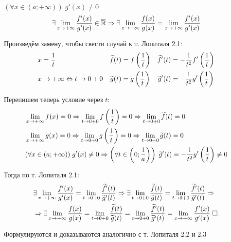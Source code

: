 \documentclass{article}
\begin{document}
$(\forall x\in(a;+\infty))\;g'(x)\neq 0$
\begin{align*}
	\exists \lim\limits_{x\to +\infty}\frac{f'(x)}{g'(x)}\in\overline{\mathbb{R}}\Rightarrow\exists\lim\limits_{x\to +\infty}\frac{f(x)}{g(x)}=\lim\limits_{x\to +\infty}\frac{f'(x)}{g'(x)}
\end{align*}

\proof

Произведём замену, чтобы свести случай к т. Лопиталя 2.1:
\begin{align*}
	 & x=\frac{1}{t}               & \widetilde{f}(t) & =f\left(\frac{1}{t}\right) & \widetilde{f}'(t) & =-\frac{1}{t^{2}}f'\left(\frac{1}{t}\right) \\
	 & x\to +\infty\Leftrightarrow t\to 0+0 & \widetilde{g}(t) & =g\left(\frac{1}{t}\right) & \widetilde{g}'(t) & =-\frac{1}{t^{2}}g'\left(\frac{1}{t}\right)
\end{align*}

Перепишем теперь условие через $t$:
\begin{align*}
	 & \lim\limits_{x\to +\infty}f(x)=0\Rightarrow\lim\limits_{t\to 0+0}f\left(\frac{1}{t}\right)=0\Rightarrow\lim\limits_{t\to 0+0}\widetilde{f}(t)=0 \\
	 & \lim\limits_{x\to +\infty}g(x)=0\Rightarrow\lim\limits_{t\to 0+0}g\left(\frac{1}{t}\right)=0\Rightarrow\lim\limits_{t\to 0+0}\widetilde{g}(t)=0 \\
	 & (\forall x\in(a;+\infty))\;g'(x)\neq 0\Rightarrow
	\left(\forall t\in\left(0;\frac{1}{a}\right)\right)\;\widetilde{g}'(t)=-\frac{1}{t^{2}}g'\left(\frac{1}{t}\right)\neq 0
\end{align*}

Тогда по т. Лопиталя 2.1:
\begin{align*}
	 & \exists\lim\limits_{x\to +\infty}\frac{f'(x)}{g'(x)}=\lim\limits_{t\to 0+0}\frac{\widetilde{f}'(t)}{\widetilde{g}'(t)}\Rightarrow
	\exists\lim\limits_{t\to 0+0}\frac{\widetilde{f}(t)}{\widetilde{g}(t)}=\lim\limits_{t\to 0+0}\frac{\widetilde{f}'(t)}{\widetilde{g}'(t)}\Rightarrow  \\
	 & \Rightarrow\exists\lim\limits_{x\to +\infty}\frac{f(x)}{g(x)}=\lim\limits_{t\to 0+0}\frac{\widetilde{f}(t)}{\widetilde{g}(t)}
	=\lim\limits_{t\to 0+0}\frac{\widetilde{f}'(t)}{\widetilde{g}'(t)}=\lim\limits_{x\to+\infty}\frac{f'(x)}{g'(x)}\;\square.
\end{align*}

\theorem[Лопиталя 3.2 и 3.3]

Формулируются и доказываются аналогично с т. Лопиталя 2.2 и 2.3
\end{document}
